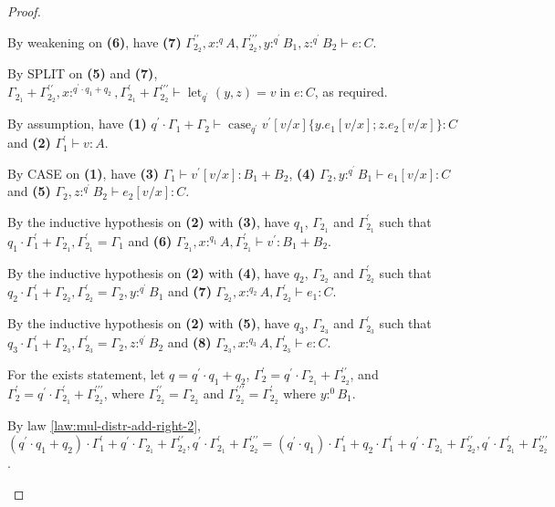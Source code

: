 \documentclass[acmsmall,screen,nonacm]{acmart}
\DeclareMathOperator{\llet}{\text{let}}
\DeclareMathOperator{\lin}{\text{in}}
\DeclareMathOperator{\case}{\text{case}}
\newcommand{\tee}{\vdash}
\begin{document}
\begin{proof}
\begin{description}
    By weakening on \textbf{(6)}, have \textbf{(7)} $\Gamma_{2_2}^{\prime\prime}, x :^q A, \Gamma_{2_2}^{\prime\prime\prime}, y :^{q^\prime} B_1, z :^{q^\prime} B_2 \tee e : C$.

    By SPLIT on \textbf{(5)} and \textbf{(7)}, $\Gamma_{2_1} + \Gamma_{2_2}^{\prime\prime}, x :^{q^\prime \cdot q_1 + q_2}, \Gamma_{2_1}^\prime + \Gamma_{2_2}^{\prime\prime\prime} \tee \llet_{q^\prime} (y, z) = v \lin e : C$, as required.
    \\
    \item[Case CASE.] 
    By assumption, have \textbf{(1)} $q^\prime \cdot \Gamma_1 + \Gamma_2 \tee \case_{q^\prime} v^\prime[v/x] \{y.e_1[v/x]; z.e_2[v/x]\} : C$ and \textbf{(2)} $\Gamma_1^\prime \tee v : A$.
    
    By CASE on \textbf{(1)}, have \textbf{(3)} $\Gamma_1 \tee v^\prime[v/x] : B_1 + B_2$, \textbf{(4)} $\Gamma_2, y :^{q^\prime} B_1 \tee e_1[v/x] : C$ and \textbf{(5)} $\Gamma_2, z :^{q^\prime} B_2 \tee e_2[v/x] : C$.

    By the inductive hypothesis on \textbf{(2)} with \textbf{(3)}, have $q_1$, $\Gamma_{2_1}$ and $\Gamma_{2_1}^\prime$ such that $q_1 \cdot \Gamma_1^\prime + \Gamma_{2_1}, \Gamma_{2_1}^\prime = \Gamma_1$ and \textbf{(6)} $\Gamma_{2_1}, x :^{q_1} A, \Gamma_{2_1}^\prime \tee v^\prime : B_1 + B_2$.
    
    By the inductive hypothesis on \textbf{(2)} with \textbf{(4)}, have $q_2$, $\Gamma_{2_2}$ and $\Gamma_{2_2}^\prime$ such that $q_2 \cdot \Gamma_1^\prime + \Gamma_{2_2}, \Gamma_{2_2}^\prime = \Gamma_2, y :^{q^\prime} B_1$ and \textbf{(7)} $\Gamma_{2_2}, x :^{q_2} A, \Gamma_{2_2}^\prime \tee e_1 : C$.

    By the inductive hypothesis on \textbf{(2)} with \textbf{(5)}, have $q_3$, $\Gamma_{2_3}$ and $\Gamma_{2_3}^\prime$ such that $q_3 \cdot \Gamma_1^\prime + \Gamma_{2_3}, \Gamma_{2_3}^\prime = \Gamma_2, z :^{q^\prime} B_2$ and \textbf{(8)} $\Gamma_{2_3}, x :^{q_3} A, \Gamma_{2_3}^\prime \tee e : C$.
    
    For the exists statement, let $q = q^\prime \cdot q_1 + q_2$, $\Gamma_2^\prime = q^\prime \cdot \Gamma_{2_1} + \Gamma_{2_2}^{\prime\prime}$, and $\Gamma_2^\prime = q^\prime \cdot \Gamma_{2_1}^\prime + \Gamma_{2_2}^{\prime\prime\prime}$, where $\Gamma_{2_2}^{\prime\prime} = \Gamma_{2_2}$ and $\Gamma_{2_2}^{\prime\prime\prime} = \Gamma_{2_2}^\prime$ where $y :^0 B_1$.

    By law \ref{law:mul-distr-add-right-2}, $(q^\prime \cdot q_1 + q_2) \cdot \Gamma_1^\prime + q^\prime \cdot \Gamma_{2_1} + \Gamma_{2_2}^{\prime\prime}, q^\prime \cdot \Gamma_{2_1}^\prime + \Gamma_{2_2}^{\prime\prime\prime} = (q^\prime \cdot q_1) \cdot \Gamma_1^\prime + q_2 \cdot \Gamma_1^\prime + q^\prime \cdot \Gamma_{2_1} + \Gamma_{2_2}^{\prime\prime}, q^\prime \cdot \Gamma_{2_1}^\prime + \Gamma_{2_2}^{\prime\prime\prime}$.
    

\end{description}
\end{proof}
\end{document}
